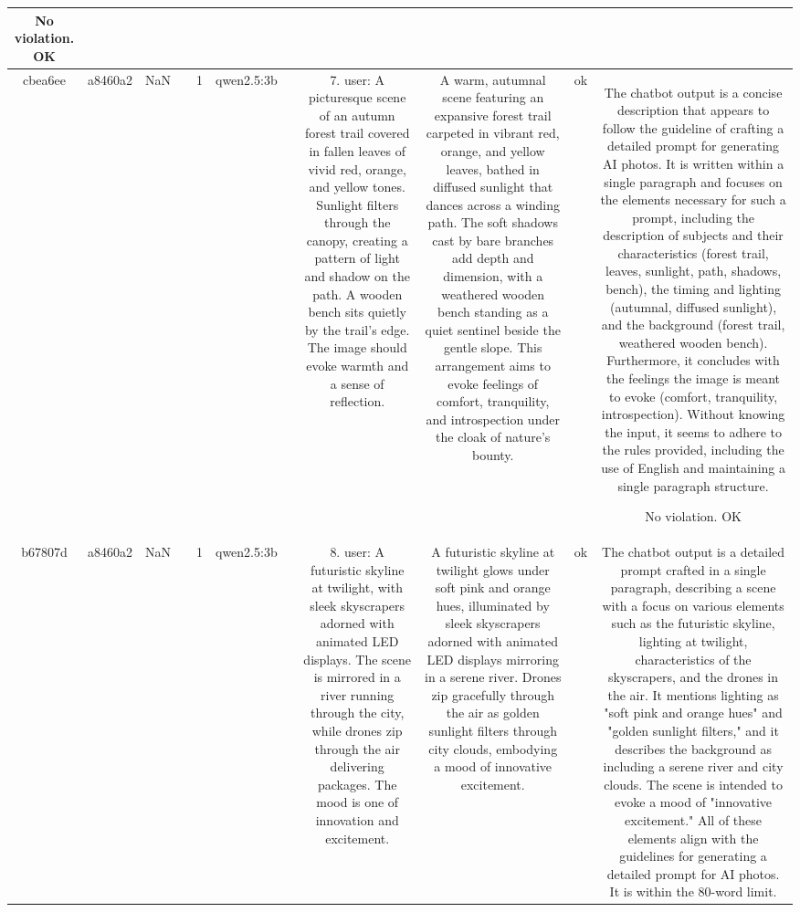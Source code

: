 \begin{table}[h!]
\begin{tabular}{|c|c|c|c|c|c|c|c|c|c|c|}
No violation.
OK\\
\hline
cbea6ee & a8460a2 & NaN &  & 1 & qwen2.5:3b &  & 7. user: A picturesque scene of an autumn forest trail covered in fallen leaves of vivid red, orange, and yellow tones. Sunlight filters through the canopy, creating a pattern of light and shadow on the path. A wooden bench sits quietly by the trail's edge. The image should evoke warmth and a sense of reflection. & A warm, autumnal scene featuring an expansive forest trail carpeted in vibrant red, orange, and yellow leaves, bathed in diffused sunlight that dances across a winding path. The soft shadows cast by bare branches add depth and dimension, with a weathered wooden bench standing as a quiet sentinel beside the gentle slope. This arrangement aims to evoke feelings of comfort, tranquility, and introspection under the cloak of nature's bounty. & ok & The chatbot output is a concise description that appears to follow the guideline of crafting a detailed prompt for generating AI photos. It is written within a single paragraph and focuses on the elements necessary for such a prompt, including the description of subjects and their characteristics (forest trail, leaves, sunlight, path, shadows, bench), the timing and lighting (autumnal, diffused sunlight), and the background (forest trail, weathered wooden bench). Furthermore, it concludes with the feelings the image is meant to evoke (comfort, tranquility, introspection). Without knowing the input, it seems to adhere to the rules provided, including the use of English and maintaining a single paragraph structure.

No violation.
OK\\
\hline
b67807d & a8460a2 & NaN &  & 1 & qwen2.5:3b &  & 8. user: A futuristic skyline at twilight, with sleek skyscrapers adorned with animated LED displays. The scene is mirrored in a river running through the city, while drones zip through the air delivering packages. The mood is one of innovation and excitement. & A futuristic skyline at twilight glows under soft pink and orange hues, illuminated by sleek skyscrapers adorned with animated LED displays mirroring in a serene river. Drones zip gracefully through the air as golden sunlight filters through city clouds, embodying a mood of innovative excitement. & ok & The chatbot output is a detailed prompt crafted in a single paragraph, describing a scene with a focus on various elements such as the futuristic skyline, lighting at twilight, characteristics of the skyscrapers, and the drones in the air. It mentions lighting as "soft pink and orange hues" and "golden sunlight filters," and it describes the background as including a serene river and city clouds. The scene is intended to evoke a mood of "innovative excitement." All of these elements align with the guidelines for generating a detailed prompt for AI photos. It is within the 80-word limit. 


\end{tabular}
\end{table}
